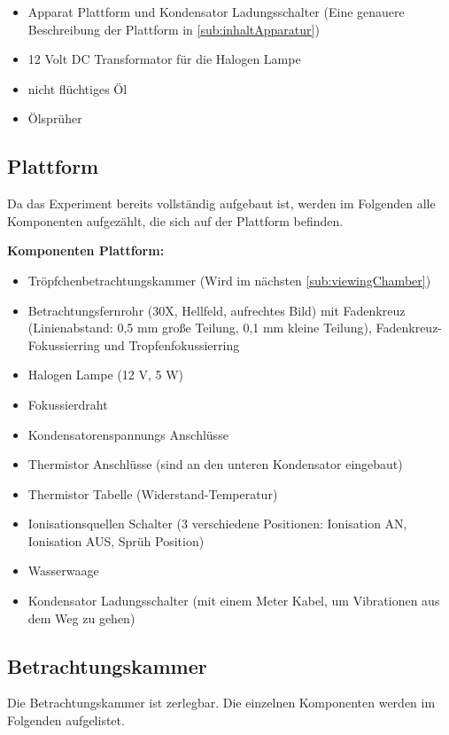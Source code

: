 \begin{itemize}
	\item Apparat Plattform und Kondensator Ladungsschalter (Eine genauere Beschreibung der Plattform in \autoref{sub:inhaltApparatur})
	\item 12 Volt DC Transformator für die Halogen Lampe
	\item nicht flüchtiges Öl
	\item Ölsprüher 
\end{itemize}

\subsection{Plattform}\label{sub:inhaltApparatur}
Da das Experiment bereits vollständig aufgebaut ist, werden im Folgenden alle Komponenten aufgezählt, die sich auf der Plattform befinden.

\noindent \textbf{Komponenten Plattform:}

\begin{itemize}\label{item:apparatur}
	\item Tröpfchenbetrachtungskammer (Wird im nächsten \autoref{sub:viewingChamber})
	\item Betrachtungsfernrohr (30X, Hellfeld, aufrechtes Bild) mit Fadenkreuz (Linienabstand: 0,5 mm große Teilung, 0,1 mm kleine Teilung), Fadenkreuz-Fokussierring und Tropfenfokussierring
	\item Halogen Lampe (12 V, 5 W)
	\item Fokussierdraht
	\item Kondensatorenspannungs Anschlüsse
	\item Thermistor Anschlüsse (sind an den unteren Kondensator eingebaut)
	\item Thermistor Tabelle (Widerstand-Temperatur)
	\item Ionisationsquellen Schalter (3 verschiedene Positionen: Ionisation AN, Ionisation AUS, Sprüh Position)
	\item Wasserwaage
	\item Kondensator Ladungsschalter (mit einem Meter Kabel, um Vibrationen aus dem Weg zu gehen)
\end{itemize}


\subsection{Betrachtungskammer}\label{sub:viewingChamber}
Die Betrachtungskammer ist zerlegbar. Die einzelnen Komponenten werden im Folgenden aufgelistet.

